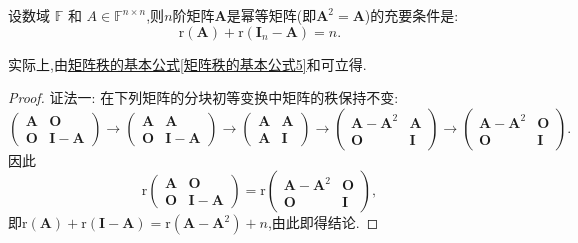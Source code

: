 \documentclass[../../main.tex]{subfiles}%
\begin{document}
\begin{proposition}[幂等矩阵关于秩的判定准则]\label{proposition:幂等矩阵关于秩的判定准则}
设数域 $\mathbb{F}$ 和 $A \in \mathbb{F}^{n \times n}$,则\(n\)阶矩阵\(\boldsymbol{A}\)是幂等矩阵(即\(\boldsymbol{A}^2 = \boldsymbol{A}\))的充要条件是:
\[
\mathrm{r}(\boldsymbol{A})+\mathrm{r}(\boldsymbol{I}_n - \boldsymbol{A}) = n.
\]
\end{proposition}
\begin{note}
实际上,由\hyperref[矩阵秩的基本公式5]{矩阵秩的基本公式\ref{矩阵秩的基本公式5}}和可立得.
\end{note}
\begin{proof}

{\color{blue}证法一:}
在下列矩阵的分块初等变换中矩阵的秩保持不变:
\[
\begin{pmatrix}
\boldsymbol{A}&\boldsymbol{O}\\
\boldsymbol{O}&\boldsymbol{I}-\boldsymbol{A}
\end{pmatrix}\to
\begin{pmatrix}
\boldsymbol{A}&\boldsymbol{A}\\
\boldsymbol{O}&\boldsymbol{I}-\boldsymbol{A}
\end{pmatrix}\to
\begin{pmatrix}
\boldsymbol{A}&\boldsymbol{A}\\
\boldsymbol{A}&\boldsymbol{I}
\end{pmatrix}\to
\begin{pmatrix}
\boldsymbol{A}-\boldsymbol{A}^2&\boldsymbol{A}\\
\boldsymbol{O}&\boldsymbol{I}
\end{pmatrix}\to
\begin{pmatrix}
\boldsymbol{A}-\boldsymbol{A}^2&\boldsymbol{O}\\
\boldsymbol{O}&\boldsymbol{I}
\end{pmatrix}.
\]
因此
\[
\mathrm{r}\begin{pmatrix}
\boldsymbol{A}&\boldsymbol{O}\\
\boldsymbol{O}&\boldsymbol{I}-\boldsymbol{A}
\end{pmatrix}=\mathrm{r}\begin{pmatrix}
\boldsymbol{A}-\boldsymbol{A}^2&\boldsymbol{O}\\
\boldsymbol{O}&\boldsymbol{I}
\end{pmatrix},
\]
即\(\mathrm{r}(\boldsymbol{A})+\mathrm{r}(\boldsymbol{I}-\boldsymbol{A})=\mathrm{r}(\boldsymbol{A}-\boldsymbol{A}^2)+n\),由此即得结论.


\end{proof}
\end{document}
